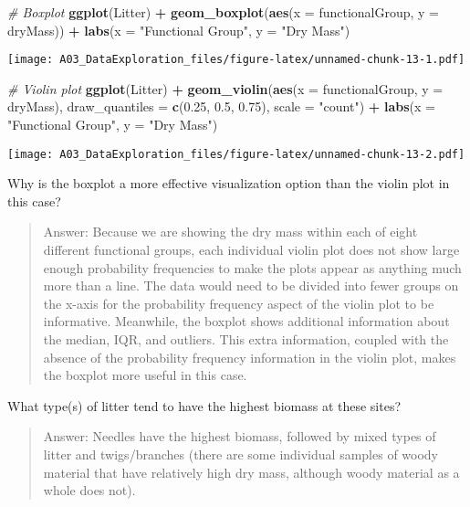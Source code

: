 \documentclass[]{article}
\newenvironment{Shaded}{\begin{snugshade}}{\end{snugshade}}
\newcommand{\CommentTok}[1]{\textcolor[rgb]{0.56,0.35,0.01}{\textit{#1}}}
\newcommand{\DataTypeTok}[1]{\textcolor[rgb]{0.13,0.29,0.53}{#1}}
\newcommand{\FloatTok}[1]{\textcolor[rgb]{0.00,0.00,0.81}{#1}}
\newcommand{\KeywordTok}[1]{\textcolor[rgb]{0.13,0.29,0.53}{\textbf{#1}}}
\newcommand{\NormalTok}[1]{#1}
\newcommand{\OperatorTok}[1]{\textcolor[rgb]{0.81,0.36,0.00}{\textbf{#1}}}
\newcommand{\StringTok}[1]{\textcolor[rgb]{0.31,0.60,0.02}{#1}}
\begin{document}
\begin{Shaded}
\begin{Highlighting}[]
\CommentTok{# Boxplot}
\KeywordTok{ggplot}\NormalTok{(Litter) }\OperatorTok{+}\StringTok{ }\KeywordTok{geom_boxplot}\NormalTok{(}\KeywordTok{aes}\NormalTok{(}\DataTypeTok{x =}\NormalTok{ functionalGroup, }\DataTypeTok{y =}\NormalTok{ dryMass)) }\OperatorTok{+}\StringTok{ }\KeywordTok{labs}\NormalTok{(}\DataTypeTok{x =} \StringTok{"Functional Group"}\NormalTok{, }
    \DataTypeTok{y =} \StringTok{"Dry Mass"}\NormalTok{)}
\end{Highlighting}
\end{Shaded}

\texttt{[image: A03\_DataExploration\_files/figure-latex/unnamed-chunk-13-1.pdf]}

\begin{Shaded}
\begin{Highlighting}[]
\CommentTok{# Violin plot}
\KeywordTok{ggplot}\NormalTok{(Litter) }\OperatorTok{+}\StringTok{ }\KeywordTok{geom_violin}\NormalTok{(}\KeywordTok{aes}\NormalTok{(}\DataTypeTok{x =}\NormalTok{ functionalGroup, }\DataTypeTok{y =}\NormalTok{ dryMass), }\DataTypeTok{draw_quantiles =} \KeywordTok{c}\NormalTok{(}\FloatTok{0.25}\NormalTok{, }
    \FloatTok{0.5}\NormalTok{, }\FloatTok{0.75}\NormalTok{), }\DataTypeTok{scale =} \StringTok{"count"}\NormalTok{) }\OperatorTok{+}\StringTok{ }\KeywordTok{labs}\NormalTok{(}\DataTypeTok{x =} \StringTok{"Functional Group"}\NormalTok{, }\DataTypeTok{y =} \StringTok{"Dry Mass"}\NormalTok{)}
\end{Highlighting}
\end{Shaded}

\texttt{[image: A03\_DataExploration\_files/figure-latex/unnamed-chunk-13-2.pdf]}

Why is the boxplot a more effective visualization option than the violin
plot in this case?

\begin{quote}
Answer: Because we are showing the dry mass within each of eight
different functional groups, each individual violin plot does not show
large enough probability frequencies to make the plots appear as
anything much more than a line. The data would need to be divided into
fewer groups on the x-axis for the probability frequency aspect of the
violin plot to be informative. Meanwhile, the boxplot shows additional
information about the median, IQR, and outliers. This extra information,
coupled with the absence of the probability frequency information in the
violin plot, makes the boxplot more useful in this case.
\end{quote}

What type(s) of litter tend to have the highest biomass at these sites?

\begin{quote}
Answer: Needles have the highest biomass, followed by mixed types of
litter and twigs/branches (there are some individual samples of woody
material that have relatively high dry mass, although woody material as
a whole does not).
\end{quote}
\end{document}
